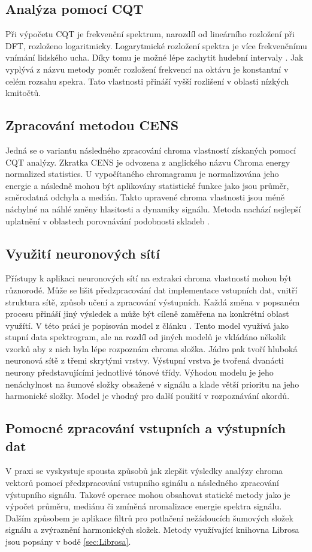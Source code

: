   \subsection{Analýza pomocí CQT}
  Při výpočetu \acs{CQT} je frekvenční spektrum, narozdíl od lineárního rozložení při \acs{DFT}, rozloženo logaritmicky. Logarytmické rozložení spektra je více frekvenčnímu vnímání lidského ucha. Díky tomu je možné lépe zachytit hudební intervaly \cite{Chroma_from_CQT}. Jak vyplývá z názvu metody poměr rozložení frekvencí na oktávu je konstantní v celém rozsahu spekra. Tato vlastnosti přináší vyšší rozlišení v oblasti nízkých kmitočtů. 

  \subsection{Zpracování metodou CENS}
  Jedná se o variantu následného zpracování chroma vlastností získaných pomocí \acs{CQT} analýzy. Zkratka \acs {CENS} je odvozena z anglického názvu Chroma energy normalized statistics. U vypočítaného chromagramu je normalizována jeho energie a následně mohou být aplikovány statistické funkce jako jsou průměr, směrodatná odchyla a medián. Takto upravené chroma vlastnosti jsou méně náchylné na náhlé změny hlasitosti a dynamiky signálu. Metoda nachází nejlepší uplatnění v oblastech porovnávání podobnosti skladeb \cite{MuellerEwert11_ChromaToolbox_ISMIR}. 

  \subsection{Využití neuronových sítí}
  Přístupy k aplikaci neuronových sítí na extrakci chroma vlastností mohou být různorodé. Může se lišit předzpracování dat implementace vstupních dat, vnitří struktura sítě, způsob učení a zpracování výstupních. Každá změna v popsaném procesu přináší jiný výsledek a může být cíleně zaměřena na konkrétní oblast využítí. V této práci je popisován model z článku \cite{The_deep_chroma_extractor}. Tento model využívá jako stupní data spektrogram, ale na rozdíl od jiných modelů je vkládáno několik vzorků aby z nich byla lépe rozpoznám chroma složka. Jádro pak tvoří hluboká neuronová sítě z třemi skrytými vrstvy. Výstupní vrstva je tvořená dvanácti neurony představujícími jednotlivé tónové třídy. Výhodou modelu je jeho nenáchylnost na šumové složky obsažené v signálu a klade větší prioritu na jeho harmonické složky. Model je vhodný pro další použití v rozpoznávání akordů. 

  \subsection{Pomocné zpracování vstupních a výstupních dat}
  V praxi se vyskystuje spousta způsobů jak zlepšit výsledky analýzy chroma vektorů pomocí předzpracování vstupního sginálu a následného zpracování výstupního signálu. Takové operace mohou obsahovat statické metody jako je výpočet průměru, mediánu či zmíněná nromalizace energie spektra signálu. Dalším způsobem je aplikace filtrů pro potlačení nežádoucích šumových složek signálu a zvýraznění harmonických složek. Metody využívající knihovna Librosa jsou popsány v bodě \ref{sec:Librosa}.

